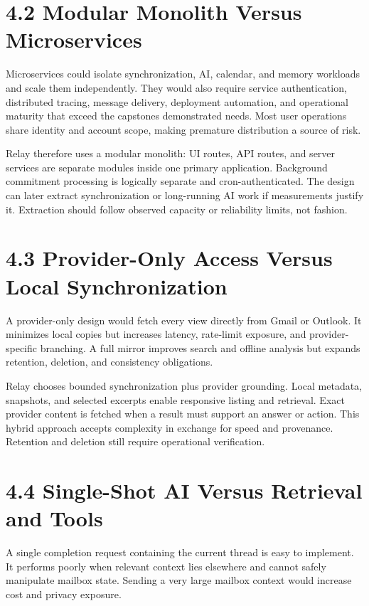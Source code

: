\documentclass[
]{report}
\begin{document}
\section{4.2 Modular Monolith Versus
Microservices}\label{42-modular-monolith-versus-microservices}

Microservices could isolate synchronization, AI, calendar, and memory
workloads and scale them independently. They would also require service
authentication, distributed tracing, message delivery, deployment
automation, and operational maturity that exceed the
capstone\textquotesingle s demonstrated needs. Most user operations
share identity and account scope, making premature distribution a source
of risk.

Relay therefore uses a modular monolith: UI routes, API routes, and
server services are separate modules inside one primary application.
Background commitment processing is logically separate and
cron-authenticated. The design can later extract synchronization or
long-running AI work if measurements justify it. Extraction should
follow observed capacity or reliability limits, not fashion.

\section{4.3 Provider-Only Access Versus Local
Synchronization}\label{43-provider-only-access-versus-local-synchronization}

A provider-only design would fetch every view directly from Gmail or
Outlook. It minimizes local copies but increases latency, rate-limit
exposure, and provider-specific branching. A full mirror improves search
and offline analysis but expands retention, deletion, and consistency
obligations.

Relay chooses bounded synchronization plus provider grounding. Local
metadata, snapshots, and selected excerpts enable responsive listing and
retrieval. Exact provider content is fetched when a result must support
an answer or action. This hybrid approach accepts complexity in exchange
for speed and provenance. Retention and deletion still require
operational verification.

\section{4.4 Single-Shot AI Versus Retrieval and
Tools}\label{44-single-shot-ai-versus-retrieval-and-tools}

A single completion request containing the current thread is easy to
implement. It performs poorly when relevant context lies elsewhere and
cannot safely manipulate mailbox state. Sending a very large mailbox
context would increase cost and privacy exposure.
\end{document}
